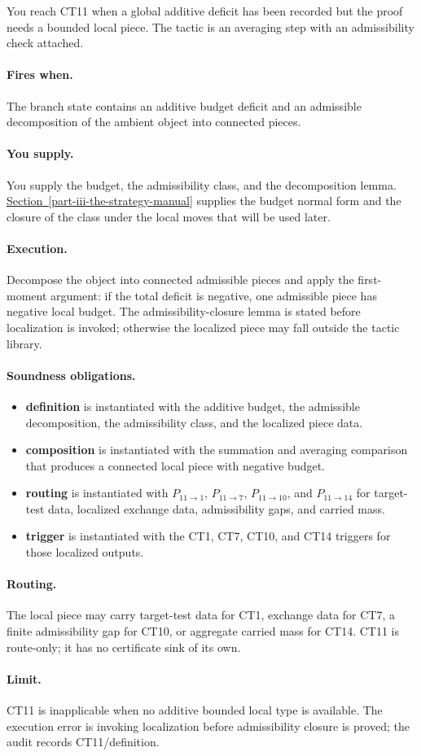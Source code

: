 \documentclass[
  11pt,
]{article}
\providecommand{\tightlist}{%
  \setlength{\itemsep}{0pt}\setlength{\parskip}{0pt}}
\theoremstyle{definition}
\newcommand{\secref}[1]{\hyperref[#1]{Section~\ref*{#1}}}
\newcommand{\ctpar}[1]{\paragraph{#1.}}
\begin{document}
You reach CT11 when a global additive deficit has been recorded but the
proof needs a bounded local piece.  The tactic is an averaging step with
an admissibility check attached.

\ctpar{Fires when}
The branch state contains an additive budget deficit and an admissible
decomposition of the ambient object into connected pieces.

\ctpar{You supply}
You supply the budget, the admissibility class, and the decomposition
lemma.  \secref{part-iii-the-strategy-manual} supplies the budget normal form and the closure of the
class under the local moves that will be used later.

\ctpar{Execution}
Decompose the object into connected admissible pieces and apply the
first-moment argument: if the total deficit is negative, one admissible
piece has negative local budget.  The admissibility-closure lemma is
stated before localization is invoked; otherwise the localized piece may
fall outside the tactic library.

\ctpar{Soundness obligations}
\begin{itemize}
\tightlist
\item \textbf{definition} is instantiated with the additive budget, the admissible decomposition, the admissibility class, and the localized piece data.
\item \textbf{composition} is instantiated with the summation and averaging comparison that produces a connected local piece with negative budget.
\item \textbf{routing} is instantiated with \(P_{11\to1}\), \(P_{11\to7}\), \(P_{11\to10}\), and \(P_{11\to14}\) for target-test data, localized exchange data, admissibility gaps, and carried mass.
\item \textbf{trigger} is instantiated with the CT1, CT7, CT10, and CT14 triggers for those localized outputs.
\end{itemize}

\ctpar{Routing}
The local piece may carry target-test data for CT1, exchange data for
CT7, a finite admissibility gap for CT10, or aggregate carried mass for
CT14.  CT11 is route-only; it has no certificate sink of its own.

\ctpar{Limit}
CT11 is inapplicable when no additive bounded local type is available. The
execution error is invoking localization before admissibility closure is
proved; the audit records CT11/definition.
\end{document}

